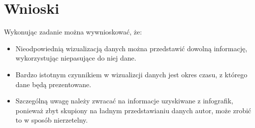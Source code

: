 \documentclass{classrep}
\begin{document}
    
    \section{Wnioski} {
        Wykonując zadanie można wywnioskować, że:
        \begin{itemize}
            \item Nieodpowiednią wizualizacją danych można przedstawić dowolną informację, wykorzystując niepasujące do niej dane.
            \item Bardzo istotnym czynnikiem w wizualizcji danych jest okres czasu, z którego dane będą prezentowane.
            \item Szczególną uwagę należy zwracać na informacje uzyskiwane z infografik, ponieważ zbyt skupiony na ładnym przedstawianiu danych autor, może zrobić to w sposób nierzetelny.
        \end{itemize}
    }

    \begin{thebibliography}{0}
    \end{thebibliography}
\end{document}
